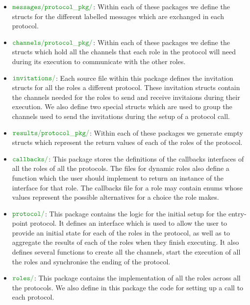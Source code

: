 \documentclass[12pt,twoside]{report}
\begin{document}

\begin{itemize}
    \item $\dirname{messages}\dirname{protocol\_pkg}$: Within each of these packages we define the structs for the different labelled messages which are exchanged in each protocol.
    \item  $\dirname{channels}\dirname{protocol\_pkg}$: Within each of these packages we define the structs which hold all the channels that each role in the protocol will need during its execution to communicate with the other roles.
    \item $\dirname{invitations}$: Each source file within this package defines the invitation structs for all the roles a different protocol. These invitation structs contain the channels needed for the roles to send and receive invitaions during their execution. We also define two special structs which are used to group the channels used to send the invitations during the setup of a protocol call. 
    \item $\dirname{results}\dirname{protocol\_pkg}$: Within each of these packages we generate empty structs which represent the return values of each of the roles of the protocol.
    \item $\dirname{callbacks}$: This package stores the definitions of the callbacks interfaces of all the roles of all the protocols. The files for dynamic roles also define a function which the user should implement to return an instance of the interface for that role. The callbacks file for a role may contain enums whose values represent the possible alternatives for a choice the role makes.
    \item $\dirname{protocol}$: This package contains the logic for the initial setup for the entry-point protocol. It defines an interface which is used to allow the user to provide an initial state for each of the roles in the protocol, as well as to aggregate the results of each of the roles when they finish executing. It also defines several functions to create all the channels, start the execution of all the roles and synchronise the ending of the protocol.
    \item $\dirname{roles}$: This package contains the implementation of all the roles across all the protocols. We also define in this package the code for setting up a call to each protocol.
\end{itemize}
\end{document}
